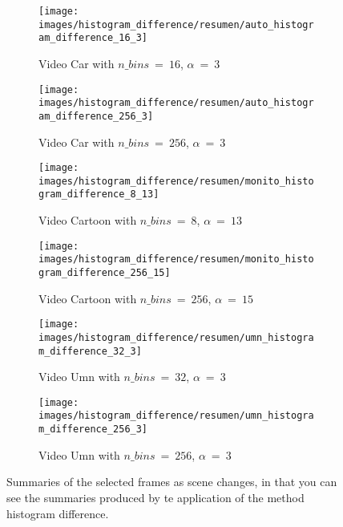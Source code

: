 \documentclass[journal]{IEEEtran}
\begin{document}
\begin{figure}
	\centering
	\begin{subfigure}{0.23\textwidth}
		\centering
		\texttt{[image: images/histogram\_difference/resumen/auto\_histogram\_difference\_16\_3]} 
		\caption{Video Car with $n\_bins~=~16$, $\alpha~=~3$}
		\label{fig:histogram_difference:resumen:car_16_3} 
	\end{subfigure}
	\centering
	\begin{subfigure}{0.23\textwidth}
		\centering
		\texttt{[image: images/histogram\_difference/resumen/auto\_histogram\_difference\_256\_3]} 
		\caption{Video Car with $n\_bins~=~256$, $\alpha~=~3$}
		\label{fig:histogram_difference:resumen:car_256_3} 
	\end{subfigure}
	
	
	\centering
	\begin{subfigure}{0.23\textwidth}
		\centering
		\texttt{[image: images/histogram\_difference/resumen/monito\_histogram\_difference\_8\_13]} 
		\caption{Video Cartoon with $n\_bins~=~8$, $\alpha~=~13$}
		\label{fig:histogram_difference:resumen:cartoon_8_13} 
	\end{subfigure}
	\centering
	\begin{subfigure}{0.23\textwidth}
		\centering
		\texttt{[image: images/histogram\_difference/resumen/monito\_histogram\_difference\_256\_15]} 
		\caption{Video Cartoon with $n\_bins~=~256$, $\alpha~=~15$}
		\label{fig:histogram_difference:resumen:cartoon_256_15} 
	\end{subfigure}
	
	
	\centering
	\begin{subfigure}{0.23\textwidth}
		\centering
		\texttt{[image: images/histogram\_difference/resumen/umn\_histogram\_difference\_32\_3]} 
		\caption{Video Umn with $n\_bins~=~32$, $\alpha~=~3$}
		\label{fig:histogram_difference:resumen:umn_32_3} 
	\end{subfigure}
	\centering
	\begin{subfigure}{0.23\textwidth}
		\centering
		\texttt{[image: images/histogram\_difference/resumen/umn\_histogram\_difference\_256\_3]} 
		\caption{Video Umn with $n\_bins~=~256$, $\alpha~=~3$}
		\label{fig:histogram_difference:resumen:umn_256_3} 
	\end{subfigure}
	
	
	\caption{Summaries of the selected frames as scene changes, in that you can see the summaries produced by te application of the method histogram difference.}
	\label{fig:histogram_difference:resumen}
\end{figure}
\end{document}
